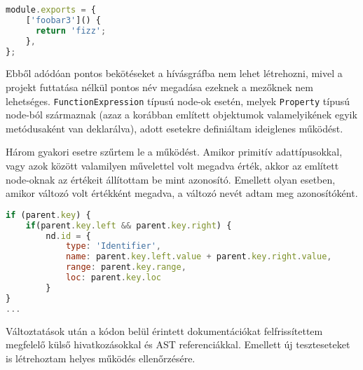 \begin{lstlisting}[caption={Computed mező példa},label={lst:jsonconfig}, language={JavaScript}]
module.exports = {
    ['foobar3']() {
      return 'fizz';
    },
};
\end{lstlisting}

Ebből adódóan pontos bekötéseket a hívásgráfba nem lehet létrehozni, mivel a projekt futtatása nélkül pontos név megadása ezeknek a mezőknek nem lehetséges.
\texttt{FunctionExpression} típusú node-ok esetén, melyek \texttt{Property} típusú node-ból származnak (azaz a korábban említett objektumok valamelyikének egyik metódusaként van deklarálva), adott esetekre definiáltam ideiglenes működést.

Három gyakori esetre szűrtem le a működést. Amikor primitív adattípusokkal, vagy azok között valamilyen művelettel volt megadva érték, akkor az említett node-oknak az értékeit állítottam be mint azonosító. Emellett olyan esetben, amikor változó volt értékként megadva, a változó nevét adtam meg azonosítóként.

\begin{lstlisting}[caption={Azonosító beállítás példa},label={lst:jsonconfig}, language={JavaScript}]
if (parent.key) {
    if(parent.key.left && parent.key.right) {
        nd.id = {
            type: 'Identifier',
            name: parent.key.left.value + parent.key.right.value,
            range: parent.key.range,
            loc: parent.key.loc
        }
}
...
\end{lstlisting}

Változtatások után  a kódon belül érintett dokumentációkat felfrissítettem megfelelő külső hivatkozásokkal és AST referenciákkal. Emellett új teszteseteket is létrehoztam helyes működés ellenőrzésére.